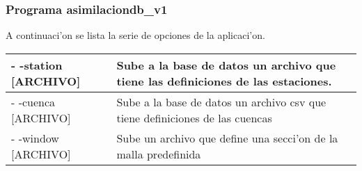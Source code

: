\subsubsection*{Programa asimilaciondb\_v1}
A continuaci'on se lista la serie de opciones de la aplicaci'on.\\
\begin{center}
  \begin{tabular}{|l|p{12cm}|}
  \hline
  - -station [ARCHIVO] & Sube a la base de datos un archivo que tiene las definiciones de las estaciones.\\ \hline 
  - -cuenca [ARCHIVO] & Sube a la base de datos un archivo csv que tiene definiciones de las cuencas\\ \hline
  - -window [ARCHIVO] & Sube un archivo que define una secci'on de la malla predefinida \\
  \hline 
  \end{tabular} 
\end{center}
